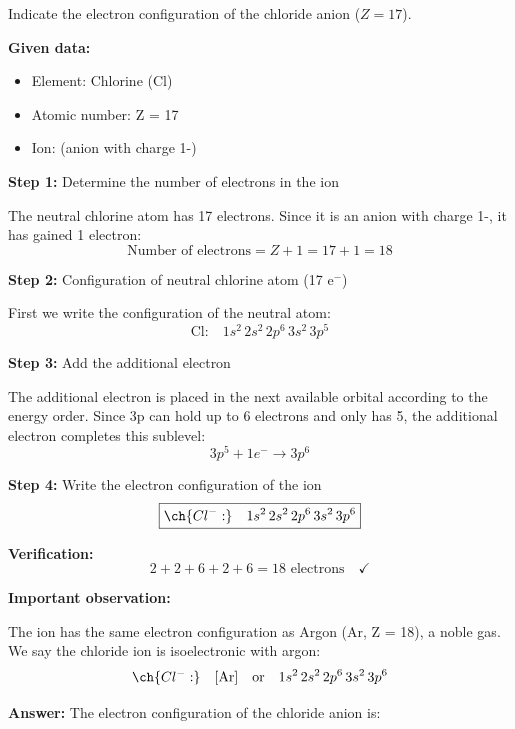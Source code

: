 \begin{exercise}
    Indicate the electron configuration of the chloride anion  (\( Z = 17 \)).
    \begin{solu}
        \textbf{Given data:}
        \begin{itemize}
            \item Element: Chlorine (Cl)
            \item Atomic number: Z = 17
            \item Ion:  (anion with charge 1-)
        \end{itemize}

        \textbf{Step 1:} Determine the number of electrons in the ion

        The neutral chlorine atom has 17 electrons. Since it is an anion with charge 1-, it has gained 1 electron:
        \[
            \text{Number of electrons} = Z + 1 = 17 + 1 = 18
        \]

        \textbf{Step 2:} Configuration of neutral chlorine atom (17 e\(^-\))

        First we write the configuration of the neutral atom:
        \[
            \text{Cl:} \quad 1s^2 \, 2s^2 \, 2p^6 \, 3s^2 \, 3p^5
        \]

        \textbf{Step 3:} Add the additional electron

        The additional electron is placed in the next available orbital according to the energy order. Since 3p can hold up to 6 electrons and only has 5, the additional electron completes this sublevel:
        \[
            3p^5 + 1e^- \rightarrow 3p^6
        \]

        \textbf{Step 4:} Write the electron configuration of the ion
        \[
            \boxed{\ch{Cl^{-}:} \quad 1s^2 \, 2s^2 \, 2p^6 \, 3s^2 \, 3p^6}
        \]

        \textbf{Verification:}
        \[
            2 + 2 + 6 + 2 + 6 = 18 \text{ electrons} \quad \checkmark
        \]

        \textbf{Important observation:}

        The  ion has the same electron configuration as Argon (Ar, Z = 18), a noble gas. We say the chloride ion is isoelectronic with argon:
        \[
            \ch{Cl^{-}:} \quad [\text{Ar}] \quad \text{or} \quad 1s^2 \, 2s^2 \, 2p^6 \, 3s^2 \, 3p^6
        \]

        \textbf{Answer:} The electron configuration of the chloride anion is: 
    \end{solu}
\end{exercise}

